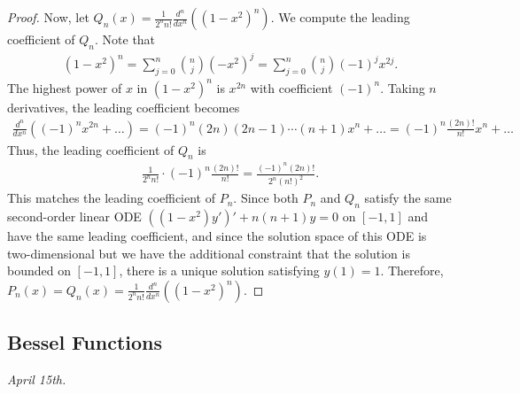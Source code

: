 \begin{proof}
Now, let $Q_n(x) = \frac{1}{2^n n!} \frac{d^n}{dx^n}((1-x^2)^n)$. We compute the leading coefficient of $Q_n$. Note that
\begin{align}
    (1-x^2)^n = \sum_{j=0}^{n} \binom{n}{j} (-x^2)^j = \sum_{j=0}^{n} \binom{n}{j} (-1)^j x^{2j}.
\end{align}
The highest power of $x$ in $(1-x^2)^n$ is $x^{2n}$ with coefficient $(-1)^n$. Taking $n$ derivatives, the leading coefficient becomes
\begin{align}
    \frac{d^n}{dx^n}((-1)^n x^{2n} + \ldots) = (-1)^n (2n)(2n-1) \cdots (n+1) x^n + \ldots = (-1)^n \frac{(2n)!}{n!} x^n + \ldots
\end{align}
Thus, the leading coefficient of $Q_n$ is
\begin{align}
    \frac{1}{2^n n!} \cdot (-1)^n \frac{(2n)!}{n!} = \frac{(-1)^n (2n)!}{2^n (n!)^2}.
\end{align}
This matches the leading coefficient of $P_n$. Since both $P_n$ and $Q_n$ satisfy the same second-order linear ODE $((1-x^2)y')' + n(n+1)y = 0$ on $[-1,1]$ and have the same leading coefficient, and since the solution space of this ODE is two-dimensional but we have the additional constraint that the solution is bounded on $[-1,1]$, there is a unique solution satisfying $y(1) = 1$. Therefore, $P_n(x) = Q_n(x) = \frac{1}{2^n n!} \frac{d^n}{dx^n}((1-x^2)^n)$.
\end{proof}

\subsection{Bessel Functions}
\noindent \textit{April 15th.}


